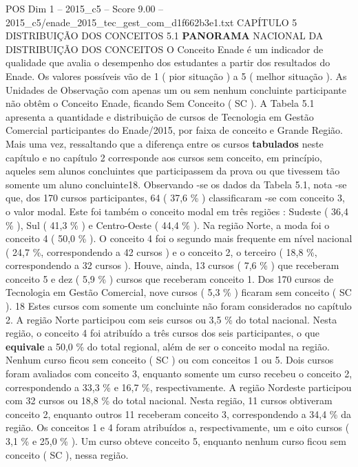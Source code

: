 \begin{textsample}{POS Dim 1 – 2015\_c5 – Score 9.00 – 2015\_c5/enade\_2015\_tec\_gest\_com\_d1f662b3e1.txt}  \label{ex:f1_pos_100}
CAPÍTULO 5 DISTRIBUIÇÃO DOS CONCEITOS 5.1 \textbf{PANORAMA} NACIONAL DA DISTRIBUIÇÃO DOS CONCEITOS O Conceito Enade é um indicador de qualidade que avalia o desempenho dos estudantes a partir dos resultados do Enade.
Os valores possíveis vão de 1 ( pior situação ) a 5 ( melhor situação ).
As Unidades de Observação com apenas um ou sem nenhum concluinte participante não obtêm o Conceito Enade, ficando Sem Conceito ( SC ).
A Tabela 5.1 apresenta a quantidade e distribuição de cursos de Tecnologia em Gestão Comercial participantes do Enade/2015, por faixa de conceito e Grande Região.
Mais uma vez, ressaltando que a diferença entre os cursos \textbf{tabulados} neste capítulo e no capítulo 2 corresponde aos cursos sem conceito, em princípio, aqueles sem alunos concluintes que participassem da prova ou que tivessem tão somente um aluno concluinte18.
Observando -se os dados da Tabela 5.1, nota -se que, dos 170 cursos participantes, 64 ( 37,6 \% ) classificaram -se com conceito 3, o valor modal.
Este foi também o conceito modal em três regiões : Sudeste ( 36,4 \% ), Sul ( 41,3 \% ) e Centro-Oeste ( 44,4 \% ).
Na região Norte, a moda foi o conceito 4 ( 50,0 \% ).
O conceito 4 foi o segundo mais frequente em nível nacional ( 24,7 \%, correspondendo a 42 cursos ) e o conceito 2, o terceiro ( 18,8 \%, correspondendo a 32 cursos ).
Houve, ainda, 13 cursos ( 7,6 \% ) que receberam conceito 5 e dez ( 5,9 \% ) cursos que receberam conceito 1.
Dos 170 cursos de Tecnologia em Gestão Comercial, nove cursos ( 5,3 \% ) ficaram sem conceito ( SC ). 18 Estes cursos com somente um concluinte não foram considerados no capítulo 2.
A região Norte participou com seis cursos ou 3,5 \% do total nacional.
Nesta região, o conceito 4 foi atribuído a três cursos dos seis participantes, o que \textbf{equivale} a 50,0 \% do total regional, além de ser o conceito modal na região.
Nenhum curso ficou sem conceito ( SC ) ou com conceitos 1 ou 5.
Dois cursos foram avaliados com conceito 3, enquanto somente um curso recebeu o conceito 2, correspondendo a 33,3 \% e 16,7 \%, respectivamente.
A região Nordeste participou com 32 cursos ou 18,8 \% do total nacional.
Nesta região, 11 cursos obtiveram conceito 2, enquanto outros 11 receberam conceito 3, correspondendo a 34,4 \% da região.
Os conceitos 1 e 4 foram atribuídos a, respectivamente, um e oito cursos ( 3,1 \% e 25,0 \% ).
Um curso obteve conceito 5, enquanto nenhum curso ficou sem conceito ( SC ), nessa região.

\end{textsample}
